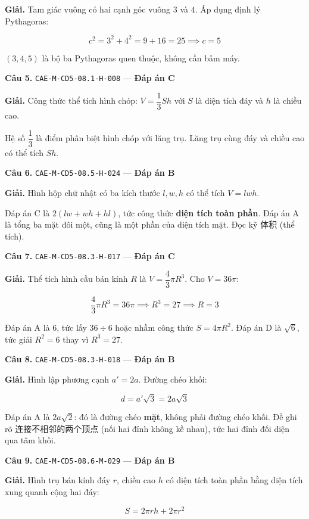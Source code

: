 \documentclass[11pt, a4paper]{article}
\begin{document}
\textbf{Giải.} Tam giác vuông có hai cạnh góc vuông $3$ và $4$. Áp dụng định lý Pythagoras:

$$c^2 = 3^2 + 4^2 = 9 + 16 = 25 \implies c = 5$$

 $(3, 4, 5)$ là bộ ba Pythagoras quen thuộc, không cần bấm máy.

\textbf{Câu 5.} \texttt{CAE-M-CD5-08.1-H-008} — \textbf{Đáp án C}

\textbf{Giải.} Công thức thể tích hình chóp: $V = \dfrac{1}{3}Sh$ với $S$ là diện tích đáy và $h$ là chiều cao.

 Hệ số $\dfrac{1}{3}$ là điểm phân biệt hình chóp với lăng trụ. Lăng trụ cùng đáy và chiều cao có thể tích $Sh$.

\textbf{Câu 6.} \texttt{CAE-M-CD5-08.5-H-024} — \textbf{Đáp án B}

\textbf{Giải.} Hình hộp chữ nhật có ba kích thước $l, w, h$ có thể tích $V = lwh$.

 Đáp án C là $2(lw + wh + hl)$, tức công thức \textbf{diện tích toàn phần}. Đáp án A là tổng ba mặt đôi một, cũng là một phần của diện tích mặt. Đọc kỹ 体积 (thể tích).

\textbf{Câu 7.} \texttt{CAE-M-CD5-08.3-H-017} — \textbf{Đáp án C}

\textbf{Giải.} Thể tích hình cầu bán kính $R$ là $V = \dfrac{4}{3}\pi R^3$. Cho $V = 36\pi$:

$$\frac{4}{3}\pi R^3 = 36\pi \implies R^3 = 27 \implies R = 3$$

 Đáp án A là $6$, tức lấy $36 \div 6$ hoặc nhầm công thức $S = 4\pi R^2$. Đáp án D là $\sqrt{6}$, tức giải $R^2 = 6$ thay vì $R^3 = 27$.

\textbf{Câu 8.} \texttt{CAE-M-CD5-08.3-H-018} — \textbf{Đáp án B}

\textbf{Giải.} Hình lập phương cạnh $a' = 2a$. Đường chéo khối:

$$d = a'\sqrt{3} = 2a\sqrt{3}$$

 Đáp án A là $2a\sqrt{2}$: đó là đường chéo \textbf{mặt}, không phải đường chéo khối. Đề ghi rõ 连接不相邻的两个顶点 (nối hai đỉnh không kề nhau), tức hai đỉnh đối diện qua tâm khối.

\textbf{Câu 9.} \texttt{CAE-M-CD5-08.6-M-029} — \textbf{Đáp án B}

\textbf{Giải.} Hình trụ bán kính đáy $r$, chiều cao $h$ có diện tích toàn phần bằng diện tích xung quanh cộng hai đáy:

$$S = 2\pi rh + 2\pi r^2$$
\end{document}
